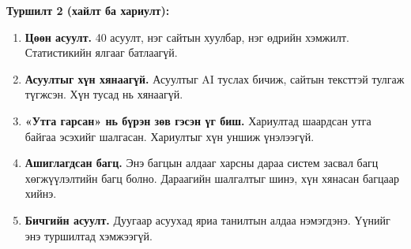 \textbf{Туршилт 2 (хайлт ба хариулт):}
\begin{enumerate}
    \item \textbf{Цөөн асуулт.} 40 асуулт, нэг сайтын хуулбар, нэг өдрийн хэмжилт. Статистикийн ялгааг батлаагүй.
    \item \textbf{Асуултыг хүн хянаагүй.} Асуултыг AI туслах бичиж, сайтын тексттэй тулгаж түгжсэн. Хүн тусад нь хянаагүй.
    \item \textbf{«Утга гарсан» нь бүрэн зөв гэсэн үг биш.} Хариултад шаардсан утга байгаа эсэхийг шалгасан. Хариултыг хүн уншиж үнэлээгүй.
    \item \textbf{Ашиглагдсан багц.} Энэ багцын алдааг харсны дараа систем засвал багц хөгжүүлэлтийн багц болно. Дараагийн шалгалтыг шинэ, хүн хянасан багцаар хийнэ.
    \item \textbf{Бичгийн асуулт.} Дуугаар асуухад яриа танилтын алдаа нэмэгдэнэ. Үүнийг энэ туршилтад хэмжээгүй.
\end{enumerate}

